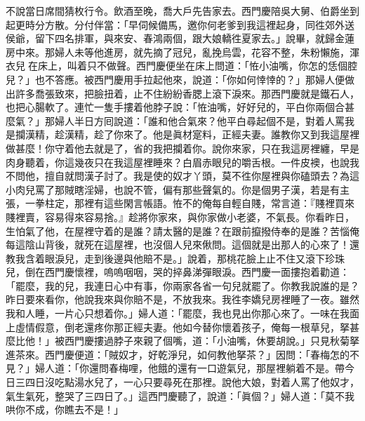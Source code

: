 不說當日席間猜枚行令。飲酒至晚，喬大戶先告家去。西門慶陪吳大舅、伯爵坐到起更時分方散。分付伴當：「早伺候備馬，邀你何老爹到我這裡起身，同徃郊外送侯爺，留下四名排軍，與來安、春鴻兩個，跟大娘轎徃夏家去。」說畢，就歸金蓮房中來。那婦人未等他進房，就先摘了冠兒，亂挽烏雲，花容不整，朱粉懶施，渾衣兒𢱉在床上，叫着只不做聲。西門慶便坐在床上問道：「恠小油嘴，你怎的恁個腔兒？」也不答應。被西門慶用手拉起他來，說道：「你如何悻悻的？」那婦人便做出許多喬張致來，把臉扭着，止不住紛紛香腮上滾下淚來。那西門慶就是鐵石人，也把心腸軟了。{}連忙一隻手摟着他脖子說：「恠油嘴，好好兒的，平白你兩個合甚麼氣？」那婦人半日方囘說道：「誰和他合氣來？他平白尋起個不是，對着人罵我是攔漢精，趁漢精，{}趁了你來了。他是眞材寔料，正經夫妻。誰教你又到我這屋裡做甚麼！你守着他去就是了，省的我把攔着你。說你來家，只在我這房裡纏，早是肉身聽着，你這幾夜只在我這屋裡睡來？白眉赤眼兒的嚼舌根。一件皮襖，也說我不問他，擅自就問漢子討了。我是使的奴才丫頭，莫不徃你屋裡與你磕頭去？為這小肉兒罵了那賊瞎淫婦，也說不管，偏有那些聲氣的。你是個男子漢，若是有主張，一拳柱定，那裡有這些閑言帳語。恠不的俺每自輕自賤，常言道：『賤裡買來賤裡賣，容易得來容易捨。』趁將你家來，與你家做小老婆，不氣長。你看昨日，生怕氣了他，在屋裡守着的是誰？請太醫的是誰？在跟前攛撥侍奉的是誰？苦惱俺每這陰山背後，就死在這屋裡，也沒個人兒來偢問。這個就是出那人的心來了！還教我含着眼淚兒，走到後邊與他賠不是。」{}說着，那桃花臉上止不住又滾下珍珠兒，倒在西門慶懷裡，嗚嗚咽咽，哭的捽鼻涕彈眼淚。西門慶一面摟抱着勸道：「罷麼，我的兒，我連日心中有事，你兩家各省一句兒就罷了。你教我說誰的是？{}昨日要來看你，他說我來與你賠不是，不放我來。我徃李嬌兒房裡睡了一夜。雖然我和人睡，一片心只想着你。」婦人道：「罷麼，我也見出你那心來了。一味在我面上虛情假意，倒老還疼你那正經夫妻。他如今替你懷着孩子，俺每一根草兒，拏甚麼比他！」被西門慶摟過脖子來親了個嘴，道：「小油嘴，休要胡說。」只見秋菊拏進茶來。西門慶便道：「賊奴才，好乾淨兒，如何教他拏茶？」因問：「春梅怎的不見？」婦人道：「你還問春梅哩，他餓的還有一口遊氣兒，那屋裡躺着不是。帶今日三四日沒吃點湯水兒了，一心只要尋死在那裡。說他大娘，對着人罵了他奴才，氣生氣死，整哭了三四日了。」這西門慶聽了，說道：「眞個？」婦人道：「莫不我哄你不成，你瞧去不是！」

